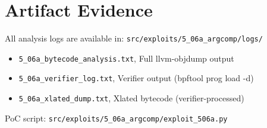 \section{Artifact Evidence}

All analysis logs are available in: \texttt{src/exploits/5\_06a\_argcomp/logs/}

\begin{itemize}
  \item \texttt{5\_06a\_bytecode\_analysis.txt}, Full llvm-objdump output
  \item \texttt{5\_06a\_verifier\_log.txt}, Verifier output (bpftool prog load -d)
  \item \texttt{5\_06a\_xlated\_dump.txt}, Xlated bytecode (verifier-processed)
\end{itemize}

\noindent
PoC script: \texttt{src/exploits/5\_06a\_argcomp/exploit\_506a.py}
